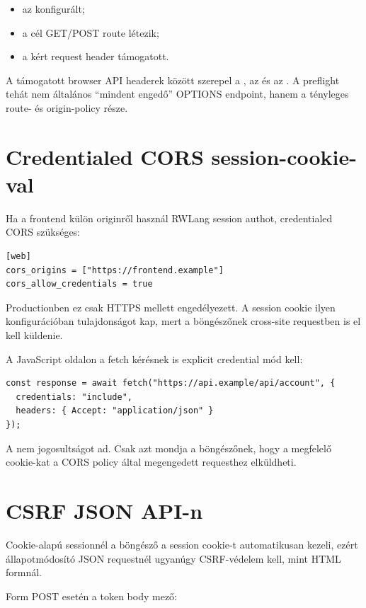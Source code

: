 \begin{itemize}
  \item az  konfigurált;
  \item a cél GET/POST route létezik;
  \item a kért request header támogatott.
\end{itemize}

A támogatott browser API headerek között szerepel a , az  és az . A preflight tehát nem általános ``mindent engedő'' OPTIONS endpoint, hanem a tényleges route- és origin-policy része.

\section{Credentialed CORS session-cookie-val}

Ha a frontend külön originről használ RWLang session authot, credentialed CORS szükséges:

\begin{lstlisting}
[web]
cors_origins = ["https://frontend.example"]
cors_allow_credentials = true
\end{lstlisting}

Productionben ez csak HTTPS mellett engedélyezett. A session cookie ilyen konfigurációban  tulajdonságot kap, mert a böngészőnek cross-site requestben is el kell küldenie.

A JavaScript oldalon a fetch kérésnek is explicit credential mód kell:

\begin{lstlisting}
const response = await fetch("https://api.example/api/account", {
  credentials: "include",
  headers: { Accept: "application/json" }
});
\end{lstlisting}

A  nem jogosultságot ad. Csak azt mondja a böngészőnek, hogy a megfelelő cookie-kat a CORS policy által megengedett requesthez elküldheti.

\section{CSRF JSON API-n}

Cookie-alapú sessionnél a böngésző a session cookie-t automatikusan kezeli, ezért állapotmódosító JSON requestnél ugyanúgy CSRF-védelem kell, mint HTML formnál.

Form POST esetén a token body mező:

